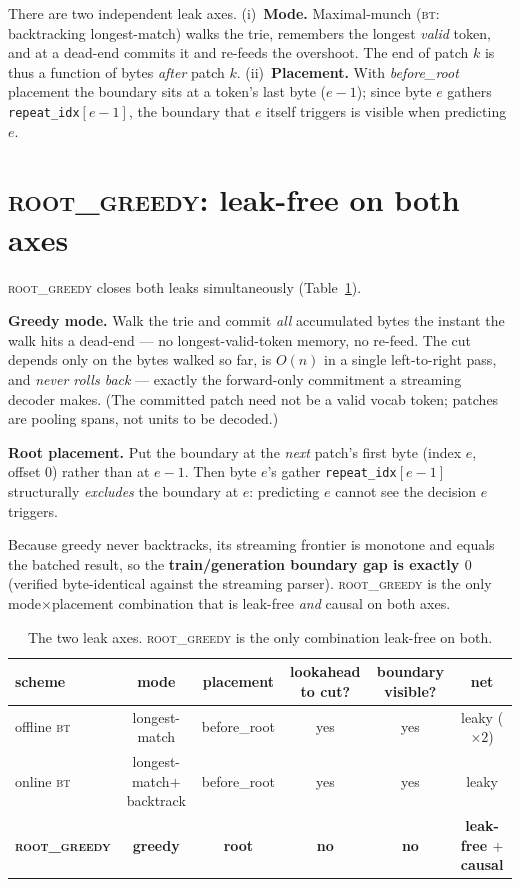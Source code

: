 \documentclass{article} %
\newcommand{\rg}{\textsc{root\_greedy}}
\newcommand{\bt}{\textsc{bt}}
\begin{document}
There are two independent leak axes. (i)~\textbf{Mode.} Maximal-munch (\bt{}: backtracking
longest-match) walks the trie, remembers the longest \emph{valid} token, and at a dead-end commits it
and re-feeds the overshoot. The end of patch $k$ is thus a function of bytes \emph{after} patch $k$.
(ii)~\textbf{Placement.} With \emph{before\_root} placement the boundary sits at a token's last byte
($e{-}1$); since byte $e$ gathers \texttt{repeat\_idx}$[e{-}1]$, the boundary that $e$ itself triggers
is visible when predicting $e$.

\section{\rg{}: leak-free on both axes}
\vspace{-2pt}
\rg{} closes both leaks simultaneously (Table~\ref{tab:axes}).

\noindent\textbf{Greedy mode.} Walk the trie and commit \emph{all} accumulated bytes the instant the
walk hits a dead-end --- no longest-valid-token memory, no re-feed. The cut depends only on the bytes
walked so far, is $O(n)$ in a single left-to-right pass, and \emph{never rolls back} --- exactly the
forward-only commitment a streaming decoder makes. (The committed patch need not be a valid vocab
token; patches are pooling spans, not units to be decoded.)

\noindent\textbf{Root placement.} Put the boundary at the \emph{next} patch's first byte (index $e$,
offset $0$) rather than at $e{-}1$. Then byte $e$'s gather \texttt{repeat\_idx}$[e{-}1]$ structurally
\emph{excludes} the boundary at $e$: predicting $e$ cannot see the decision $e$ triggers.

Because greedy never backtracks, its streaming frontier is monotone and equals the batched result, so
the \textbf{train/generation boundary gap is exactly $0$} (verified byte-identical against the
streaming parser). \rg{} is the only mode$\times$placement combination that is leak-free \emph{and}
causal on both axes.

\begin{table}[t]
\centering
\small
\begin{tabular}{lccccc}
\toprule
scheme & mode & placement & lookahead to cut? & boundary visible? & net \\
\midrule
offline \bt{} & longest-match & before\_root & yes & yes & leaky ($\times2$) \\
online \bt{}  & longest-match$+$backtrack & before\_root & yes & yes & leaky \\
\textbf{\rg{}} & \textbf{greedy} & \textbf{root} & \textbf{no} & \textbf{no} & \textbf{leak-free $+$ causal} \\
\bottomrule
\end{tabular}
\caption{The two leak axes. \rg{} is the only combination leak-free on both.}
\label{tab:axes}
\vspace{-10pt}
\end{table}
\end{document}
